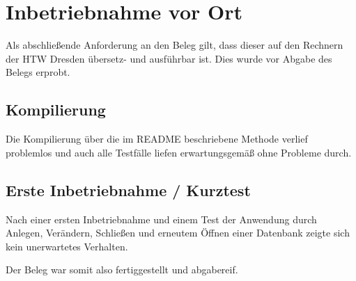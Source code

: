 \section{Inbetriebnahme vor Ort}
Als abschließende Anforderung an den Beleg gilt, dass dieser auf den Rechnern der HTW Dresden übersetz- und ausführbar
ist. Dies wurde vor Abgabe des Belegs erprobt.

\subsection{Kompilierung}
Die Kompilierung über die im README beschriebene Methode verlief problemlos und auch alle Testfälle liefen
erwartungsgemäß ohne Probleme durch.

\subsection{Erste Inbetriebnahme / Kurztest}
Nach einer ersten Inbetriebnahme und einem Test der Anwendung durch Anlegen, Verändern, Schließen und erneutem Öffnen
einer Datenbank zeigte sich kein unerwartetes Verhalten.

Der Beleg war somit also fertiggestellt und abgabereif.
